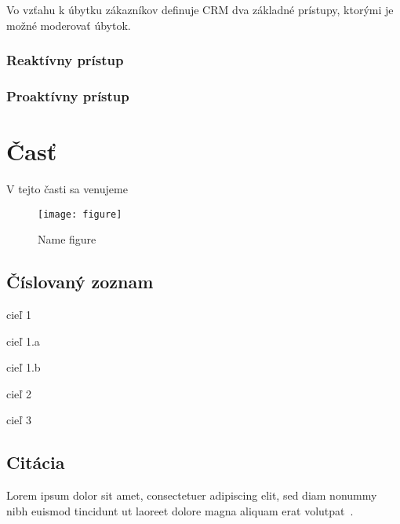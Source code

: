 Vo vzťahu k úbytku zákazníkov definuje CRM dva základné prístupy, ktorými je možné moderovať úbytok. 


\subsubsection{Reaktívny prístup}
\label{reaktivny_pristup}

\subsubsection{Proaktívny prístup}
\label{proaktivny_pristup}




\section{Časť}
\label{sec:Časť}
V tejto časti sa venujeme 
\begin{figure}[H]
\begin{center}\texttt{[image: figure]}\end{center}
\caption[Name figure]{Name figure}\label{fig:figure}
\end{figure}

\subsection{Číslovaný zoznam}
\begin{my_enumerate}
	\item {cieľ 1}
	\begin{my_enumerate}
		\item {cieľ 1.a}
		\item {cieľ 1.b}
	\end{my_enumerate}
	\item {cieľ 2}
	\item {cieľ 3}
\end{my_enumerate}

\subsection{Citácia}
Lorem ipsum dolor sit amet, consectetuer adipiscing elit, sed diam nonummy nibh euismod tincidunt ut laoreet dolore magna aliquam erat volutpat~\cite{1}.

